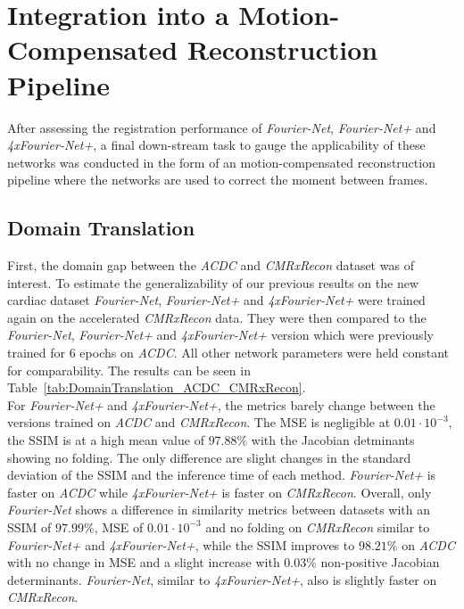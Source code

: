 \section{Integration into a Motion-Compensated Reconstruction Pipeline} \label{Sec:ResultsIntegrationMotion-CompensatedReconstructionPipeline}
After assessing the registration performance of \emph{Fourier-Net}, \emph{Fourier-Net+} and \emph{4xFourier-Net+}, a final down-stream task to gauge the applicability of these networks was conducted in the form of an motion-compensated reconstruction pipeline where the networks are used to correct the moment between frames.

\subsection{Domain Translation} \label{SubSec:ResultsDomainTranslation}
First, the domain gap between the \emph{ACDC} and \emph{CMRxRecon} dataset was of interest. To estimate the generalizability of our previous results on the new cardiac dataset 
\emph{Fourier-Net}, \emph{Fourier-Net+} and \emph{4xFourier-Net+} were trained again on the accelerated \emph{CMRxRecon} data. They were then compared to the \emph{Fourier-Net}, \emph{Fourier-Net+} and \emph{4xFourier-Net+} version which were previously trained for 6 epochs on \emph{ACDC}. All other network parameters were held constant for comparability. The results can be seen in Table~\ref{tab:DomainTranslation_ACDC_CMRxRecon}.\\
For \emph{Fourier-Net+} and \emph{4xFourier-Net+}, the metrics barely change between the versions trained on \emph{ACDC} and \emph{CMRxRecon}. The MSE is negligible at $0.01 \cdot 10^{-3}$, the SSIM is at a high mean value of $97.88 \%$ with the Jacobian detminants showing no folding. The only difference are slight changes in the standard deviation of the SSIM and the inference time of each method. \emph{Fourier-Net+} is faster on \emph{ACDC} while \emph{4xFourier-Net+} is faster on \emph{CMRxRecon}. Overall, only \emph{Fourier-Net} shows a difference in similarity metrics between datasets with an SSIM of $97.99 \%$, MSE of $0.01 \cdot 10^{-3}$ and no folding on \emph{CMRxRecon} similar to \emph{Fourier-Net+} and \emph{4xFourier-Net+}, while the SSIM improves to $98.21 \%$ on \emph{ACDC} with no change in MSE and a slight increase with $0.03 \%$ non-positive Jacobian determinants. \emph{Fourier-Net}, similar to \emph{4xFourier-Net+}, also is slightly faster on \emph{CMRxRecon}.

